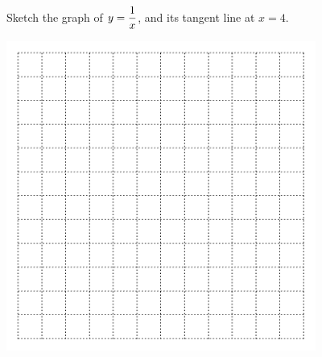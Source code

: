 \problem Sketch the graph of $\displaystyle y=\frac{1}{x}$, and its tangent line at $x=4$. 

\includegraphics[width=4in]{graphics/empty_graph_square_12}






